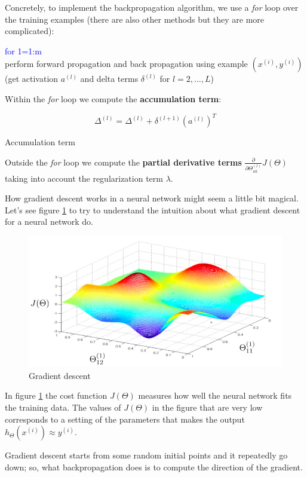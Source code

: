 Concretely, to implement the backpropagation algorithm, we use a {\it for} loop over the training examples (there are also other methods but they are more complicated):


\begin{mdframed}[style=MyFrame]
\textcolor{blue}{for 1=1:m}\\
	perform forward propagation and back propagation using example $(x^{(i)}, y^{(i)})$\\
	(get activation $a^{(l)}$ and delta terms $\delta^{(l)}$ for $l=2,\hdots,L$)
\end{mdframed}

Within the {\it for} loop we compute the {\bf accumulation term}:
\begin{eqfloat}[H]
\begin{equation}
	\Delta^{(l)} = 	\Delta^{(l)} + 	\delta^{(l+1)} (a^{(l)})^T
\end{equation}
      \addtocounter{equation}{-1}
        \caption{ Accumulation term}
        \label{eq:accumulationterm}
    \end{eqfloat}

Outside the {\it for} loop we compute the {\bf partial derivative terms} $\frac{\partial}{\partial \Theta_{uk}^{(l)}}J(\Theta)$ taking into account the regularization term $\lambda$.

How gradient descent works in a neural network might seem a little bit magical. Let's see figure \ref{fig:graddesc} to try to understand the intuition about what gradient descent for a neural network do.


\begin{figure}[H]
\begin{center}
\includegraphics[scale=0.35]{images/graddesc}
\end{center}
\caption{Gradient descent } 
\label{fig:graddesc}
\end{figure}

In figure \ref{fig:graddesc} the cost function $J(\Theta)$ measures how well the neural network fits the training data. The values of $J(\Theta)$ in the figure that are very low corresponds to a setting of the parameters that makes the output $h_\Theta(x^{(i)}) \approx y^{(i)}$.

Gradient descent starts from some random initial points and it repeatedly go down; so, what backpropagation does is to compute the direction of the gradient.